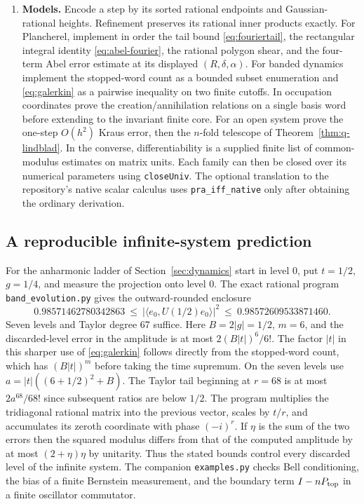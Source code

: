 \begin{enumerate}
\item \textbf{Models.} Encode a step by its sorted rational endpoints and Gaussian-rational heights. Refinement preserves its rational inner products exactly. For Plancherel, implement in order the tail bound \eqref{eq:fouriertail}, the rectangular integral identity \eqref{eq:abel-fourier}, the rational polygon shear, and the four-term Abel error estimate at its displayed $(R,\delta,\alpha)$. For banded dynamics implement the stopped-word count as a bounded subset enumeration and \eqref{eq:galerkin} as a pairwise inequality on two finite cutoffs. In occupation coordinates prove the creation/annihilation relations on a single basis word before extending to the invariant finite core. For an open system prove the one-step $O(h^2)$ Kraus error, then the $n$-fold telescope of Theorem~\ref{thm:q-lindblad}. In the converse, differentiability is a supplied finite list of common-modulus estimates on matrix units. Each family can then be closed over its numerical parameters using \texttt{closeUniv}. The optional translation to the repository's native scalar calculus uses \texttt{pra\_iff\_native} only after obtaining the ordinary derivation.
\end{enumerate}

\subsection{A reproducible infinite-system prediction}
For the anharmonic ladder of Section~\ref{sec:dynamics} start in level $0$, put $t=1/2$, $g=1/4$, and measure the projection onto level $0$. The exact rational program \texttt{band\_evolution.py} gives the outward-rounded enclosure
\[
  0.98571462780342863\ \le\ |\langle e_0,U(1/2)e_0\rangle|^2\ \le\ 0.98572609533871460 .
\]
Seven levels and Taylor degree 67 suffice. Here $B=2|g|=1/2$, $m=6$, and the discarded-level error in the amplitude is at most $2(B|t|)^6/6!$. The factor $|t|$ in this sharper use of \eqref{eq:galerkin} follows directly from the stopped-word count, which has $(B|t|)^m$ before taking the time supremum. On the seven levels use $a=|t|((6+1/2)^2+B)$. The Taylor tail beginning at $r=68$ is at most $2a^{68}/68!$ since subsequent ratios are below $1/2$. The program multiplies the tridiagonal rational matrix into the previous vector, scales by $t/r$, and accumulates its zeroth coordinate with phase $(-i)^r$. If $\eta$ is the sum of the two errors then the squared modulus differs from that of the computed amplitude by at most $(2+\eta)\eta$ by unitarity. Thus the stated bounds control every discarded level of the infinite system. The companion \texttt{examples.py} checks Bell conditioning, the bias of a finite Bernstein measurement, and the boundary term $I-nP_{\rm top}$ in a finite oscillator commutator.

